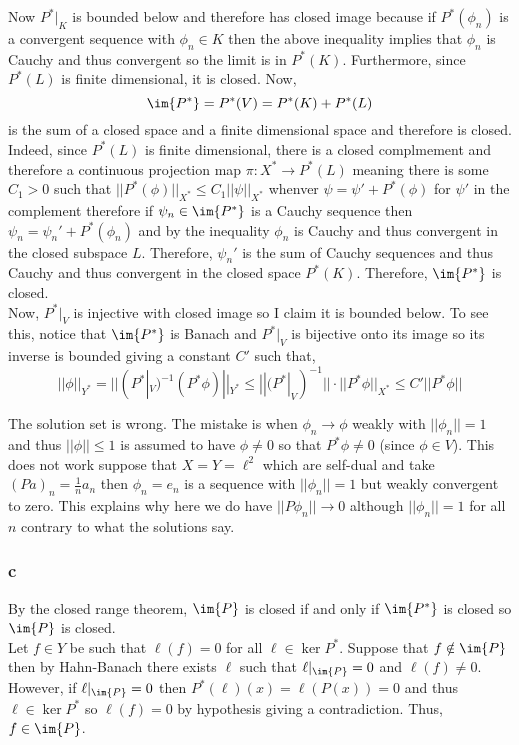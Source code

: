 \documentclass[12pt]{article}
\begin{document}
Now $P^*|_K$ is bounded below and therefore has closed image because if $P^*(\phi_n)$ is a convergent sequence with $\phi_n \in K$ then the above inequality implies that $\phi_n$ is Cauchy and thus convergent so the limit is in $P^*(K)$. Furthermore, since $P^*(L)$ is finite dimensional, it is closed. Now,
\[ \im{P^*} = P^*(V) = P^*(K) + P^*(L) \]
is the sum of a closed space and a finite dimensional space and therefore is closed. Indeed, since $P^*(L)$ is finite dimensional, there is a closed complmement and therefore a continuous projection map $\pi : X^* \to P^*(L)$ meaning there is some $C_1 > 0$ such that $|| P^*(\phi) ||_{X^*} \le C_1 || \psi ||_{X^*}$ whenver $\psi = \psi' + P^*(\phi)$ for $\psi'$ in the complement therefore if $\psi_n \in \im{P^*}$ is a Cauchy sequence then $\psi_n = \psi_n' + P^*(\phi_n)$ and by the inequality $\phi_n$ is Cauchy and thus convergent in the closed subspace $L$. Therefore, $\psi_n'$ is the sum of Cauchy sequences and thus Cauchy and thus convergent in the closed space $P^*(K)$. Therefore, $\im{P^*}$ is closed.
\bigskip\\
Now, $P^*|_V$ is injective with closed image so I claim it is bounded below. To see this, notice that $\im{P^*}$ is Banach and $P^*|_V$ is bijective onto its image so its inverse is bounded giving a constant $C'$ such that,
\[ || \phi ||_{Y^*} = || (P^*|_V)^{-1} (P^* \phi) ||_{Y^*} \le ||(P^*|_V)^{-1}|| \cdot || P^* \phi ||_{X^*} \le C' || P^* \phi || \]

\begin{rmk}
The solution set is wrong. The mistake is when $\phi_n \to \phi$ weakly with $|| \phi_n || = 1$ and thus $|| \phi || \le 1$ is assumed to have $\phi \neq 0$ so that $P^* \phi \neq 0$ (since $\phi \in V$). This does not work suppose that $X = Y = \ell^2$ which are self-dual and take $(P a)_n = \frac{1}{n} a_n$ then $\phi_n = e_n$ is a sequence with $|| \phi_n || = 1$ but weakly convergent to zero. This explains why here we do have $|| P \phi_n || \to 0$ although $|| \phi_n || = 1$ for all $n$ contrary to what the solutions say.
\end{rmk}

\subsubsection{c}

By the closed range theorem, $\im{P}$ is closed if and only if $\im{P^*}$ is closed so $\im{P}$ is closed.
\bigskip\\
Let $f \in Y$ be such that $\ell(f) = 0$ for all $\ell \in \ker{P^*}$. Suppose that $f \notin \im{P}$ then by Hahn-Banach there exists $\ell$ such that $\ell|_{\im{P}} = 0$ and $\ell(f) \neq 0$. However, if $\ell|_{\im{P}} = 0$ then $P^*(\ell)(x) = \ell(P(x)) = 0$ and thus $\ell \in \ker{P^*}$ so $\ell(f) = 0$ by hypothesis giving a contradiction. Thus, $f \in \im{P}$.
\end{document}
